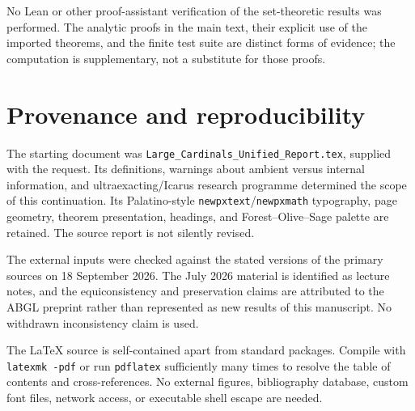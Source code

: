 \documentclass[11pt,letterpaper]{article}
\theoremstyle{definition}
\begin{document}
No Lean or other proof-assistant verification of the set-theoretic results was performed. The analytic proofs in the main text, their explicit use of the imported theorems, and the finite test suite are distinct forms of evidence; the computation is supplementary, not a substitute for those proofs.

\clearpage
\section{Provenance and reproducibility}\label{app:provenance}

The starting document was \nolinkurl{Large_Cardinals_Unified_Report.tex}, supplied with the request. Its definitions, warnings about ambient versus internal information, and ultraexacting/Icarus research programme determined the scope of this continuation. Its Palatino-style \texttt{newpxtext}/\texttt{newpxmath} typography, page geometry, theorem presentation, headings, and Forest--Olive--Sage palette are retained. The source report is not silently revised.

The external inputs were checked against the stated versions of the primary sources on 18 September 2026. The July 2026 material is identified as lecture notes, and the equiconsistency and preservation claims are attributed to the ABGL preprint rather than represented as new results of this manuscript. No withdrawn inconsistency claim is used.

The \LaTeX{} source is self-contained apart from standard packages. Compile with \texttt{latexmk -pdf} or run \texttt{pdflatex} sufficiently many times to resolve the table of contents and cross-references. No external figures, bibliography database, custom font files, network access, or executable shell escape are needed.
\end{document}
